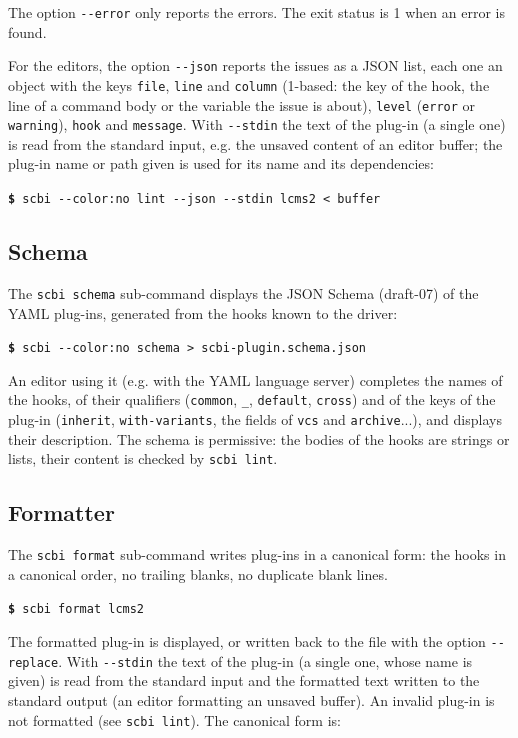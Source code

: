 \documentclass[a4paper,12pt,twoside]{article}
\newcommand{\code}[1]{\texttt{#1}}
\newcommand{\cmd}[1]{\tabto{1cm}\hspace{0.5cm}\texttt{\textbf{\$} #1}}
\newcommand{\ddash}{-{}-}
\begin{document}
The option \code{\ddash{}error} only reports the errors. The exit status is 1 when an error is found.

For the editors, the option \code{\ddash{}json} reports the issues as a JSON
list, each one an object with the keys \code{file}, \code{line} and
\code{column} (1-based: the key of the hook, the line of a command body
or the variable the issue is about), \code{level} (\code{error} or
\code{warning}), \code{hook} and \code{message}. With \code{\ddash{}stdin} the
text of the plug-in (a single one) is read from the standard input,
e.g. the unsaved content of an editor buffer; the plug-in name or path
given is used for its name and its dependencies:

\cmd{scbi \ddash{}color:no lint \ddash{}json \ddash{}stdin lcms2 < buffer}

\subsection{Schema}
\label{schema}

The \code{scbi schema} sub-command displays the JSON Schema (draft-07)
of the YAML plug-ins, generated from the hooks known to the driver:

\cmd{scbi \ddash{}color:no schema > scbi-plugin.schema.json}

An editor using it (e.g. with the YAML language server) completes the
names of the hooks, of their qualifiers (\code{common}, \code{\_},
\code{default}, \code{cross}) and of the keys of the plug-in
(\code{inherit}, \code{with-variants}, the fields of \code{vcs} and
\code{archive}...), and displays their description. The schema is
permissive: the bodies of the hooks are strings or lists, their content
is checked by \code{scbi lint}.

\subsection{Formatter}
\label{formatter}

The \code{scbi format} sub-command writes plug-ins in a canonical form: the
hooks in a canonical order, no trailing blanks, no duplicate blank lines.

\cmd{scbi format lcms2}

The formatted plug-in is displayed, or written back to the file with the
option \code{\ddash{}replace}. With \code{\ddash{}stdin} the text of the plug-in (a
single one, whose name is given) is read from the standard input and
the formatted text written to the standard output (an editor
formatting an unsaved buffer). An invalid plug-in is not formatted (see
\code{scbi lint}). The canonical form is:
\end{document}
